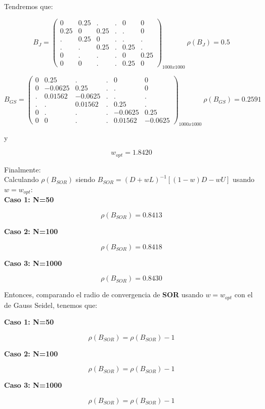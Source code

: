 Tendremos que:

$$
    B_{J} = \begin{pmatrix}
     0 &  0.25 &	 . &	 . &	 0 &	 0 \\
  0.25 &	 0 &  0.25 &	 . &     . &	 0 \\
     . &  0.25 &	 0 &	 . &	 . &	 . \\
     . &	 . &  0.25 &	 . &  0.25 &	 . \\
     0 &	 . &	 . &	 . &	 0 &  0.25 \\
     0 &	 0 &	 . &	 . &  0.25 &	 0
    \end{pmatrix}_{1000x1000}\ \rho(B_{J}) = 0.5
$$

$$
    B_{GS} = \begin{pmatrix}
     0 &	0.25 &	 . &	 . &	 0 &	 0 \\
     0 &	-0.0625 & 0.25 &	 . &     . &	 0 \\
     . &	0.01562 & -0.0625 &	 . &	 . &	 . \\
     . &	 . &	0.01562 &	 . &	0.25 &	 . \\
     0 &	 . &	 . &	 . &	 -0.0625 &	0.25 \\
     0 &	 0 &	 . &	 . &	0.01562 &	 -0.0625
    \end{pmatrix}_{1000x1000}\ \rho(B_{GS}) = 0.2591
$$

y

$$
    w_{opt} = 1.8420
$$

Finalmente:\\

Calculando $\rho(B_{SOR})$ siendo $B_{SOR} = (D + wL)^{-1}[(1-w)D-wU]$ usando $w=w_{opt}$:\\

\textbf{Caso 1: N=50}

$$
    \rho(B_{SOR}) = 0.8413
$$

\textbf{Caso 2: N=100}

$$
    \rho(B_{SOR}) = 0.8418
$$

\textbf{Caso 3: N=1000}

$$
    \rho(B_{SOR}) = 0.8430
$$

Entonces, comparando el radio de convergencia de \textbf{SOR} usando $w=w_{opt}$ con el de Gauss Seidel, tenemos que:

\textbf{Caso 1: N=50}

$$
    \rho(B_{SOR}) = \rho(B_{SOR})-1
$$

\textbf{Caso 2: N=100}

$$
    \rho(B_{SOR}) = \rho(B_{SOR})-1
$$

\textbf{Caso 3: N=1000}

$$
    \rho(B_{SOR}) = \rho(B_{SOR})-1
$$